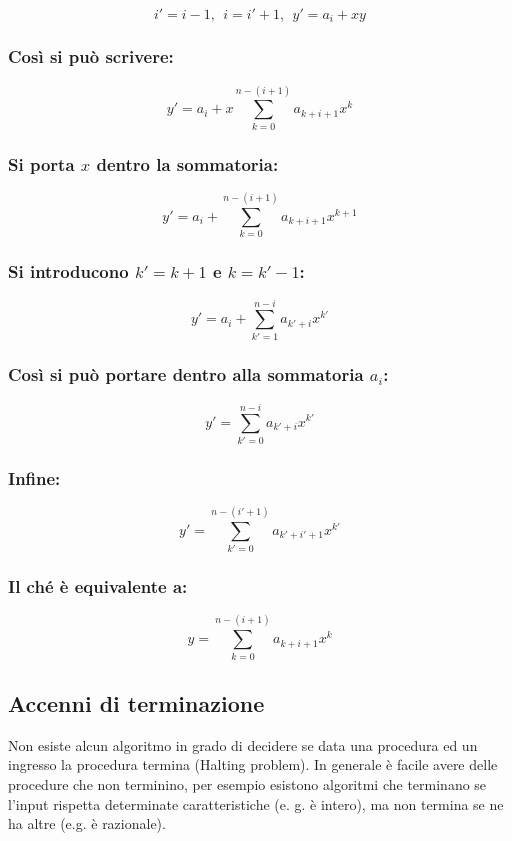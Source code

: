 $$i' = i - 1,\:\: i = i' + 1, \:\: y' = a_i + x y$$

\subsubsection{Così si può scrivere:}

$$y' = a_i + x \sum_{k = 0}^{n - (i + 1)} a_{k + i + 1} x^k$$

\subsubsection{Si porta $x$ dentro la sommatoria:}

$$y' = a_i + \sum_{k = 0}^{n - (i + 1)} a_{k + i + 1} x^{k + 1}$$

\subsubsection{Si introducono $k' = k + 1$ e $k = k' - 1$:}

$$y' = a_i + \sum_{k' = 1}^{n - i} a_{k' + i} x^{k'}$$

\subsubsection{Così si può portare dentro alla sommatoria $a_i$:}

$$y' = \sum_{k' = 0}^{n - i} a_{k'+ i} x^{k'}$$

\subsubsection{Infine:}

$$y' = \sum_{k' = 0}^{n - (i' + 1)} a_{k'+ i' + 1} x^{k'}$$

\subsubsection{Il ché è equivalente a:}


$$y = \sum_{k = 0}^{n - (i + 1)} a_{k + i + 1} x^k$$

\subsection{Accenni di terminazione}

Non esiste alcun algoritmo in grado di decidere se data una procedura ed un ingresso la procedura termina (Halting problem). 
In generale è facile avere delle procedure che non terminino, per esempio esistono algoritmi che terminano se l'input rispetta determinate caratteristiche (e. g. è intero), ma non termina se ne ha altre (e.g. è razionale).



